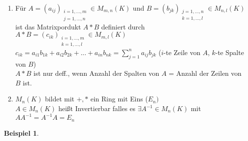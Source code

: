 \documentclass[a4paper,11pt]{article}
\newtheorem{bsp}[definition]{Beispiel}
\begin{document}
\begin{enumerate}[label=\alph*)]
\item Für $A=(a_{ij})_{\substack{i=1,...,m\\j=1,...,n}}\in M_{m,n}(K)$ und $B=(b_{jk})_{\substack{j=1,...,n\\k=1,...,l}}\in M_{n,l}(K)$ ist das Matrixpordukt $A*B$ definiert durch $A*B=(c_{ik})_{\substack{i=1,...,m\\k=1,...,l}}\in M_{m,l}(K)$ \\
$c_{ik}=a_{i1}b_{1k}+a_{i2}b_{2k}+...+a_{in}b_{nk}=\sum^n_{j=1}a_{ij}b_{jk}$ ($i$-te Zeile von $A$, $k$-te Spalte von $B$) \\
$A*B$ ist nur deff., wenn Anzahl der Spalten von $A$ = Anzahl der Zeilen von $B$ ist.
\item $M_n(K)$ bildet mit $+,*$ ein Ring mit Eins ($E_n)$ \\
$A\in M_n(K)$ heißt Invertierbar falles es $\exists A^{-1}\in M_n(K)$ mit $AA^{-1}=A^{-1}A=E_n$
\end{enumerate}
\begin{bsp}
\end{bsp}
\end{document}

